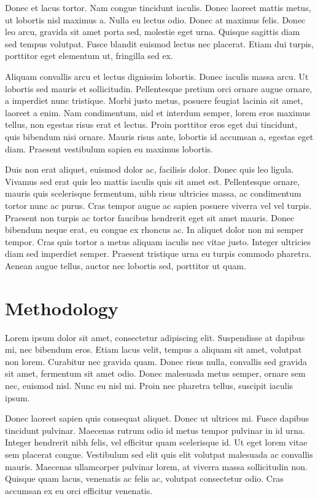 Donec et lacus tortor. Nam congue tincidunt iaculis. Donec laoreet mattis metus, ut lobortis nisl maximus a. Nulla eu lectus odio. Donec at maximus felis. Donec leo arcu, gravida sit amet porta sed, molestie eget urna. Quisque sagittis diam sed tempus volutpat. Fusce blandit euismod lectus nec placerat. Etiam dui turpis, porttitor eget elementum ut, fringilla sed ex.

Aliquam convallis arcu et lectus dignissim lobortis. Donec iaculis massa arcu. Ut lobortis sed mauris et sollicitudin. Pellentesque pretium orci ornare augue ornare, a imperdiet nunc tristique. Morbi justo metus, posuere feugiat lacinia sit amet, laoreet a enim. Nam condimentum, nisl et interdum semper, lorem eros maximus tellus, non egestas risus erat et lectus. Proin porttitor eros eget dui tincidunt, quis bibendum nisi ornare. Mauris risus ante, lobortis id accumsan a, egestas eget diam. Praesent vestibulum sapien eu maximus lobortis.

Duis non erat aliquet, euismod dolor ac, facilisis dolor. Donec quis leo ligula. Vivamus sed erat quis leo mattis iaculis quis sit amet est. Pellentesque ornare, mauris quis scelerisque fermentum, nibh risus ultricies massa, ac condimentum tortor nunc ac purus. Cras tempor augue ac sapien posuere viverra vel vel turpis. Praesent non turpis ac tortor faucibus hendrerit eget sit amet mauris. Donec bibendum neque erat, eu congue ex rhoncus ac. In aliquet dolor non mi semper tempor. Cras quis tortor a metus aliquam iaculis nec vitae justo. Integer ultricies diam sed imperdiet semper. Praesent tristique urna eu turpis commodo pharetra. Aenean augue tellus, auctor nec lobortis sed, porttitor ut quam.

\section{Methodology}
Lorem ipsum dolor sit amet, consectetur adipiscing elit. Suspendisse at dapibus mi, nec bibendum eros. Etiam lacus velit, tempus a aliquam sit amet, volutpat non lorem. Curabitur nec gravida quam. Donec risus nulla, convallis sed gravida sit amet, fermentum sit amet odio. Donec malesuada metus semper, ornare sem nec, euismod nisl. Nunc eu nisl mi. Proin nec pharetra tellus, suscipit iaculis ipsum.

Donec laoreet sapien quis consequat aliquet. Donec ut ultrices mi. Fusce dapibus tincidunt pulvinar. Maecenas rutrum odio id metus tempor pulvinar in id urna. Integer hendrerit nibh felis, vel efficitur quam scelerisque id. Ut eget lorem vitae sem placerat congue. Vestibulum sed elit quis elit volutpat malesuada ac convallis mauris. Maecenas ullamcorper pulvinar lorem, at viverra massa sollicitudin non. Quisque quam lacus, venenatis ac felis ac, volutpat consectetur odio. Cras accumsan ex eu orci efficitur venenatis.

